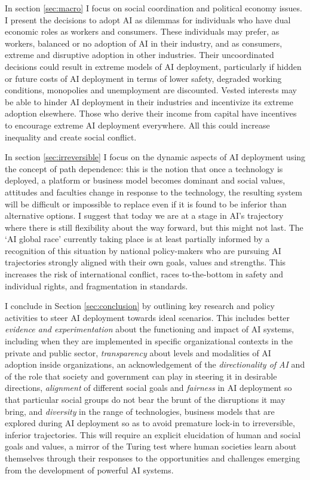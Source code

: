 \documentclass[11pt]{article}
\begin{document}
 In section \ref{sec:macro} I focus on social coordination and political economy issues. I present the decisions to adopt AI as dilemmas for individuals who have dual economic roles as workers and consumers. These individuals may prefer, as workers,  balanced or no adoption of AI in their industry, and as consumers, extreme and disruptive adoption in other industries. Their uncoordinated decisions could result in extreme models of AI deployment, particularly if hidden or future costs of AI deployment in terms of lower safety, degraded working conditions, monopolies and unemployment are discounted. Vested interests may be able to hinder AI deployment in their industries and incentivize its extreme adoption elsewhere. Those who derive their income from capital have incentives to encourage extreme AI deployment everywhere. All this could increase inequality and create social conflict.
  
 In section \ref{sec:irreversible} I focus on the dynamic aspects of AI deployment using the concept of path dependence: this is the notion that once a technology is deployed, a platform or business model becomes dominant and social values, attitudes and faculties change in response to the technology, the resulting system will be difficult or impossible to replace even if it is found to be inferior than alternative options. I suggest that today we are at a stage in AI's trajectory where there is still flexibility about the way forward, but this might not last. The `AI global race' currently taking place is at least partially informed by a recognition of this situation by national policy-makers who are pursuing AI trajectories strongly aligned with their own goals, values and strengths. This increases the risk of international conflict, races to-the-bottom in safety and individual rights, and fragmentation in standards.

I conclude in Section \ref{sec:conclusion} by outlining key research and policy activities to steer AI deployment towards ideal scenarios. This includes better \textit{evidence and experimentation} about the functioning and impact of AI systems, including when they are implemented in specific organizational contexts in the private and public sector, \textit{transparency} about levels and modalities of AI adoption inside organizations, an acknowledgement of the \textit{directionality of AI} and of the role that society and government can play in steering it in desirable directions, \textit{alignment} of different social goals and \textit{fairness} in AI deployment so that particular social groups do not bear the brunt of the disruptions it may bring, and \textit{diversity} in the range of technologies, business models that are explored during AI deployment so as to avoid premature lock-in to irreversible, inferior trajectories. This will require an explicit elucidation of human and social goals and values, a mirror of the Turing test where human societies learn about themselves through their responses to the opportunities and challenges emerging from the development of powerful AI systems. 
\end{document}
